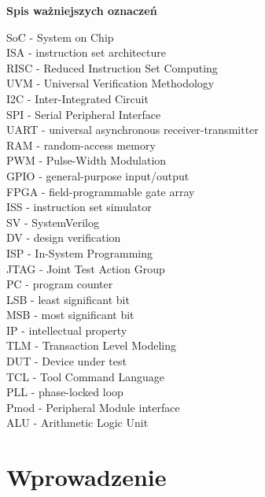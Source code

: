 \documentclass[11pt,a4paper]{article}
\begin{document}
\newpage
\listoffigures


\newpage
\begin{flushleft}
\textbf {\Large Spis ważniejszych oznaczeń}

SoC - System on Chip
\\ISA - instruction set architecture
\\RISC - Reduced Instruction Set Computing
\\UVM - Universal Verification Methodology
\\I2C - Inter-Integrated Circuit
\\SPI - Serial Peripheral Interface
\\UART - universal asynchronous receiver-transmitter
\\RAM - random-access memory
\\PWM - Pulse-Width Modulation
\\GPIO - general-purpose input/output
\\FPGA - field-programmable gate array
\\ISS - instruction set simulator
\\SV - SystemVerilog
\\DV - design verification
\\ISP - In-System Programming
\\JTAG - Joint Test Action Group
\\PC - program counter
\\LSB - least significant bit
\\MSB - most significant bit
\\IP - intellectual property
\\TLM - Transaction Level Modeling
\\DUT - Device under test
\\TCL - Tool Command Language
\\PLL - phase-locked loop
\\Pmod - Peripheral Module interface
\\ALU - Arithmetic Logic Unit 
\end{flushleft}
\vspace{0.5cm}


\newpage
\section{Wprowadzenie} 
\end{document}
